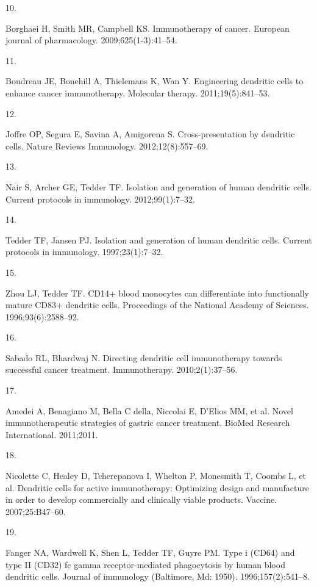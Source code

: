 \documentclass[
]{article}
\newlength{\cslhangindent}
\newlength{\csllabelwidth}
\newenvironment{CSLReferences}[2] %
 {\begin{list}{}{%
  \setlength{\itemindent}{0pt}
  \setlength{\leftmargin}{0pt}
  \setlength{\parsep}{0pt}
  \ifodd #1
   \setlength{\leftmargin}{\cslhangindent}
   \setlength{\itemindent}{-1\cslhangindent}
  \fi
  \setlength{\itemsep}{#2\baselineskip}}}
 {\end{list}}
\newcommand{\CSLLeftMargin}[1]{\parbox[t]{\csllabelwidth}{\strut#1\strut}}
\newcommand{\CSLRightInline}[1]{\parbox[t]{\linewidth - \csllabelwidth}{\strut#1\strut}}
\begin{document}
\begin{CSLReferences}{0}{1}
\CSLLeftMargin{10. }%
\CSLRightInline{Borghaei H, Smith MR, Campbell KS. Immunotherapy of
cancer. European journal of pharmacology. 2009;625(1-3):41--54. }

\CSLLeftMargin{11. }%
\CSLRightInline{Boudreau JE, Bonehill A, Thielemans K, Wan Y.
Engineering dendritic cells to enhance cancer immunotherapy. Molecular
therapy. 2011;19(5):841--53. }

\CSLLeftMargin{12. }%
\CSLRightInline{Joffre OP, Segura E, Savina A, Amigorena S.
Cross-presentation by dendritic cells. Nature Reviews Immunology.
2012;12(8):557--69. }

\CSLLeftMargin{13. }%
\CSLRightInline{Nair S, Archer GE, Tedder TF. Isolation and generation
of human dendritic cells. Current protocols in immunology.
2012;99(1):7--32. }

\CSLLeftMargin{14. }%
\CSLRightInline{Tedder TF, Jansen PJ. Isolation and generation of human
dendritic cells. Current protocols in immunology. 1997;23(1):7--32. }

\CSLLeftMargin{15. }%
\CSLRightInline{Zhou LJ, Tedder TF. CD14+ blood monocytes can
differentiate into functionally mature CD83+ dendritic cells.
Proceedings of the National Academy of Sciences. 1996;93(6):2588--92. }

\CSLLeftMargin{16. }%
\CSLRightInline{Sabado RL, Bhardwaj N. Directing dendritic cell
immunotherapy towards successful cancer treatment. Immunotherapy.
2010;2(1):37--56. }

\CSLLeftMargin{17. }%
\CSLRightInline{Amedei A, Benagiano M, Bella C della, Niccolai E,
D'Elios MM, et al. Novel immunotherapeutic strategies of gastric cancer
treatment. BioMed Research International. 2011;2011. }

\CSLLeftMargin{18. }%
\CSLRightInline{Nicolette C, Healey D, Tcherepanova I, Whelton P,
Monesmith T, Coombs L, et al. Dendritic cells for active immunotherapy:
Optimizing design and manufacture in order to develop commercially and
clinically viable products. Vaccine. 2007;25:B47--60. }

\CSLLeftMargin{19. }%
\CSLRightInline{Fanger NA, Wardwell K, Shen L, Tedder TF, Guyre PM. Type
i (CD64) and type II (CD32) fc gamma receptor-mediated phagocytosis by
human blood dendritic cells. Journal of immunology (Baltimore, Md:
1950). 1996;157(2):541--8. }


\end{CSLReferences}
\end{document}
